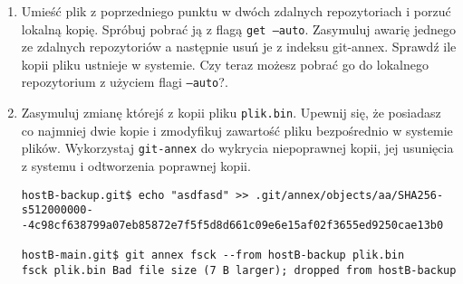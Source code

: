 \documentclass[polish]{article}
\newif\ifteacher
\begin{document}
\begin{enumerate}
\ifteacher
    \begin{lstlisting}[frame=single, caption=Wynik]
hostB:hostB-main.git$ git config annex.numcopies 2
hostB:hostB-main.git$ git annex copy important_file.txt --to hostA-main
hostB:hostB-main.git$ git annex drop important_file.txt
drop important_file.txt (checking hostA-main...) (unsafe)
  Could only verify the existence of 1 out of 2 necessary copies

  No other repository is known to contain the file.

  (Use --force to override this check, or adjust annex.numcopies.)
failed
git-annex: drop: 1 failed
    \end{lstlisting}
\fi

    \item
    Umieść plik z poprzedniego punktu w dwóch zdalnych repozytoriach i porzuć
    lokalną kopię. Spróbuj pobrać ją z flagą \texttt{get --auto}. Zasymuluj
    awarię jednego ze zdalnych repozytoriów a następnie usuń je z indeksu
    git-annex. Sprawdź ile kopii pliku ustnieje w systemie. Czy teraz możesz
    pobrać go do lokalnego repozytorium z użyciem flagi \texttt{--auto}?.

\ifteacher
    \begin{lstlisting}[frame=single, caption=Wynik]
[root@lab429-08 hostB-main.git]# git annex get --auto plik.bin
get plik.bin (from hostB-backup...) SHA256-s512000000--4c98cf638799a07eb85872e7f5f5d8d661c09e6e15af02f3655ed9250cae13b0
512000000 100\% 56.26MB/s 0:00:08 (xfer#1, to-check=0/1)

sent 512062644 bytes received 31 bytes 53901334.21 bytes/sec
total size is 512000000 speedup is 1.00
ok
(Recording state in git...)
    \end{lstlisting}
\fi

    \item
    Zasymuluj zmianę którejś z kopii pliku \texttt{plik.bin}.
    Upewnij się, że posiadasz co najmniej dwie kopie i zmodyfikuj zawartość
    pliku bezpośrednio w systemie plików.
    Wykorzystaj \texttt{git-annex} do wykrycia niepoprawnej kopii, jej
    usunięcia z systemu i odtworzenia poprawnej kopii.

\ifteacher
    \begin{lstlisting}[frame=single, caption=Wynik]
hostB-backup.git$ echo "asdfasd" >> .git/annex/objects/aa/SHA256-s512000000--4c98cf638799a07eb85872e7f5f5d8d661c09e6e15af02f3655ed9250cae13b0

hostB-main.git$ git annex fsck --from hostB-backup plik.bin
fsck plik.bin Bad file size (7 B larger); dropped from hostB-backup


\end{lstlisting}
\end{enumerate}
\end{document}
